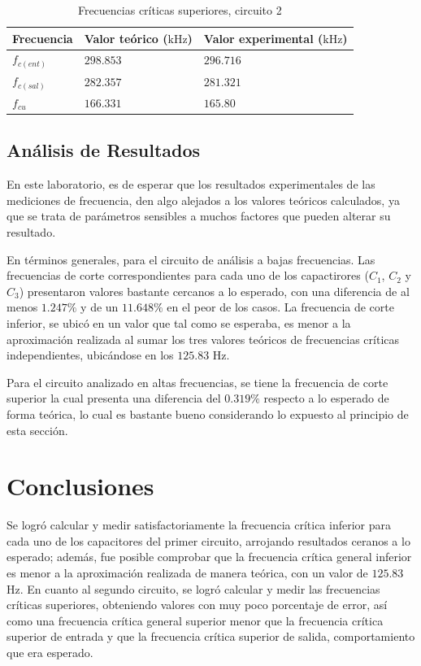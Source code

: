 \documentclass[journal]{IEEEtran}
\begin{document}
\begin{table}[H]
        \centering
        \renewcommand{\arraystretch}{1.5}
        \caption{Frecuencias críticas superiores, circuito 2}
        \begin{tabular}{ >{\centering\arraybackslash}m{2.5cm} >{\centering\arraybackslash}m{2.5cm} >{\centering\arraybackslash}m{2.5cm} }
                \hline
            Frecuencia & Valor teórico ($\mathrm{kHz}$) & Valor experimental ($\mathrm{kHz}$)\\ 
            \hline
            \centering
            $f_{c(ent)}$ & $298.853$  & $296.716$  \\
            $f_{c(sal)}$ & $282.357$  & $281.321$  \\
            $f_{cu}$ & $166.331$  & $165.80$  \\ 
            \hline
        \end{tabular}
        \label{tabla7}
    \end{table}   

\subsection{Análisis de Resultados}
En este laboratorio, es de esperar que los resultados experimentales de las mediciones de frecuencia, den algo alejados
a los valores teóricos calculados, ya que se trata de parámetros sensibles a muchos factores que pueden alterar
su resultado. 

En términos generales, para el circuito de análisis a bajas frecuencias. Las frecuencias de corte correspondientes para cada uno
de los capactirores ($C_1$, $C_2$ y $C_3$) presentaron valores bastante cercanos a lo esperado, con una diferencia de al menos $1.247\%$ 
y de un $11.648\%$ en el peor de los casos. La frecuencia de corte inferior, se ubicó en un valor que tal como se esperaba, es menor 
a la aproximación realizada al sumar los tres valores teóricos de frecuencias críticas independientes, ubicándose en los $125.83$ $\mathrm{Hz}$. 

Para el circuito analizado en altas frecuencias, se tiene la frecuencia de corte superior la cual presenta una diferencia del $0.319\%$ 
respecto a lo esperado de forma teórica, lo cual es bastante bueno considerando lo expuesto al principio de esta sección. 


\section{Conclusiones}
Se logró calcular y medir satisfactoriamente la frecuencia crítica inferior para cada uno de los capacitores del primer circuito, 
arrojando resultados ceranos a lo esperado; además, fue posible comprobar que la frecuencia crítica general inferior es menor a la 
aproximación realizada de manera teórica, con un valor de $125.83$ $\mathrm{Hz}$.
En cuanto al segundo circuito, se logró calcular y medir las frecuencias críticas superiores, obteniendo valores con muy poco porcentaje de error, así como una frecuencia crítica general superior menor que la frecuencia crítica superior de entrada y que la frecuencia crítica superior de salida, comportamiento que era esperado.
\appendices
\end{document}
